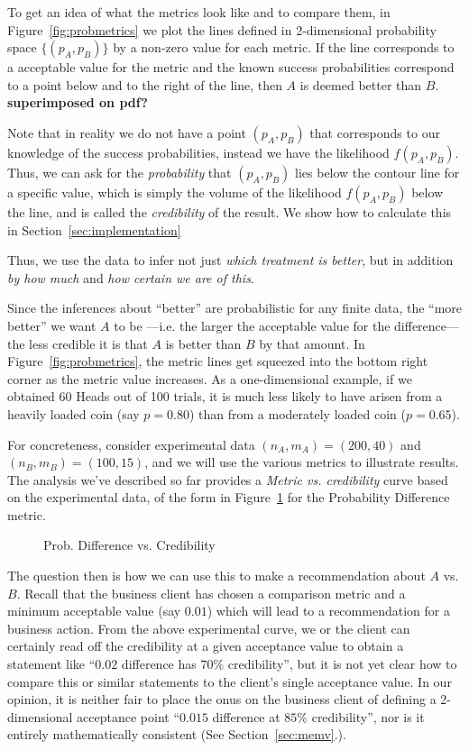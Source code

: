 \documentclass[letterpaper,12pt]{article}
\begin{document}
To get an idea of what the metrics look like and to compare them, in
Figure~\ref{fig:probmetrics} we plot the lines defined in
2-dimensional probability space \(\{(p_A,p_B)\}\) by a non-zero value
for each metric. If the line corresponds to a acceptable value for the
metric and the known success probabilities correspond to a point below
and to the right of the line, then \(A\) is deemed better than
\(B\). {\bf superimposed on pdf?}

Note that in reality we do not have a point \((p_A,p_B)\) that
corresponds to our knowledge of the success probabilities, instead we
have the likelihood \(f(p_A,p_B)\). Thus, we can ask for the {\em
  probability} that \((p_A,p_B)\) lies below the contour line for a
specific value, which is simply the volume of the likelihood
\(f(p_A,p_B)\) below the line, and is called the {\em credibility} of
the result. We show how to calculate this in
Section~\ref{sec:implementation}

Thus, we use the data to infer not just {\em which treatment is better}, but
in addition {\em by how much} and {\em how certain we are of
  this}. 

Since the inferences about ``better'' are probabilistic for any finite
data, the ``more better'' we want \(A\) to be ---i.e. the larger the
acceptable value for the difference--- the less credible it is that
\(A\) is better than \(B\) by that amount. In
Figure~\ref{fig:probmetrics}, the metric lines get squeezed
into the bottom right corner as the metric value increases. As a
one-dimensional example, if we obtained 60 Heads out of 100 trials, it
is much less likely to have arisen from a heavily loaded coin (say
\(p=0.80\)) than from a moderately loaded coin (\(p=0.65\)).

For concreteness, consider experimental data \((n_A, m_A) = (200,
40)\) and \((n_B, m_B) = (100, 15)\), and we will use the various
metrics to illustrate results. The analysis we've described so far
provides a {\em Metric vs. credibility} curve based on the
experimental data, of the form in Figure~\ref{fig:probdiff_vs_cred}
for the Probability Difference metric.
\begin{figure}[ht!]
\centering
\caption{Prob. Difference vs. Credibility \label{fig:probdiff_vs_cred}}
\end{figure}
The question then is how we can use this to make a recommendation
about \(A\) vs. \(B\). Recall that the business client has chosen a
comparison metric and a minimum acceptable value (say \(0.01\)) which
will lead to a recommendation for a business action. From the above
experimental curve, we or the client can certainly read off the
credibility at a given acceptance value to obtain a statement like
``\(0.02\) difference has \(70\%\) credibility'', but it is not yet
clear how to compare this or similar statements to the client's single
acceptance value. In our opinion, it is neither fair to place the onus
on the business client of defining a 2-dimensional acceptance point
``\(0.015\) difference at \(85\%\) credibility'', nor is it entirely
mathematically consistent (See Section~\ref{sec:memv}.).
\end{document}
